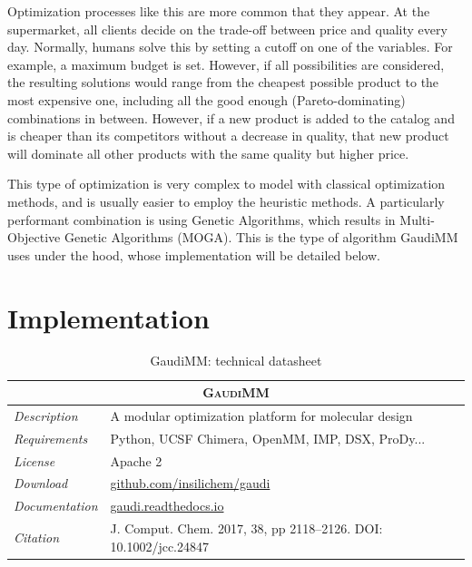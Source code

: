 Optimization processes like this are more common that they appear. At the supermarket, all clients decide on the trade-off between price and quality every day. Normally, humans solve this by setting a cutoff on one of the variables. For example, a maximum budget is set. However, if all possibilities are considered, the resulting solutions would range from the cheapest possible product to the most expensive one, including all the good enough (Pareto-dominating) combinations in between. However, if a new product is added to the catalog and is cheaper than its competitors without a decrease in quality, that new product will dominate all other products with the same quality but higher price.

This type of optimization is very complex to model with classical optimization methods, and is usually easier to employ the heuristic methods. A particularly performant combination is using Genetic Algorithms, which results in Multi-Objective Genetic Algorithms (MOGA). This is the type of algorithm GaudiMM uses under the hood, whose implementation will be detailed below.

\section{Implementation}




\begin{table}[hbtp]
	\caption{GaudiMM: technical datasheet}
	\footnotesize
	\newcommand{\tableheading}[1]{\multicolumn{2}{c}{\textsc{#1}}}
	\begin{tabularx}{\textwidth}{RL}
		\toprule
		\tableheading{GaudiMM} \\
		\toprule
		\textit{Description} & A modular optimization platform for molecular design \\
		\midrule
		\textit{Requirements} & Python, UCSF Chimera, OpenMM, IMP, DSX, ProDy... \\
		\midrule
		\textit{License} & Apache 2 \\
		\midrule
		\textit{Download} & \href{https://github.com/insilichem/gaudi}{github.com/insilichem/gaudi} \\
		\midrule
		\textit{Documentation} & \href{https://gaudi.readthedocs.io}{gaudi.readthedocs.io} \\
		\midrule
		\textit{Citation} & J. Comput. Chem. 2017, 38, pp 2118–2126. DOI: 10.1002/jcc.24847 \\
		\bottomrule

	\end{tabularx}
\end{table}


